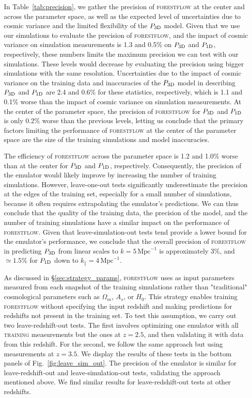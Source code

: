 \documentclass{aa}
\newcommand{\poned}{\ensuremath{P_{\rm 1D}}\xspace}
\newcommand{\pthreed}{\ensuremath{P_{\rm 3D}}\xspace}
\newcommand{\forestflow}{\textsc{forestflow}\xspace}
\newcommand{\lacehc}{\textsc{training}\xspace}
\newcommand{\iMpc}{\ensuremath{\,\mathrm{Mpc}^{-1}}}
\begin{document}
In Table~\ref{tab:precision}, we gather the precision of \forestflow at the center and across the parameter space, as well as the expected level of uncertainties due to cosmic variance and the limited flexibility of the \pthreed model. Given that we use our simulations to evaluate the precision of \forestflow, and the impact of cosmic variance on simulation measurements is 1.3 and 0.5\% on \pthreed and \poned, respectively, these numbers limits the maximum precision we can test with our simulations. These levels would decrease by evaluating the precision using bigger simulations with the same resolution. Uncertainties due to the impact of cosmic variance on the training data and inaccuracies of the \pthreed model in describing \pthreed and \poned are 2.4 and 0.6\% for these statistics, respectively, which is 1.1 and 0.1\% worse than the impact of cosmic variance on simulation measurements. At the center of the parameter space, the precision of \forestflow for \pthreed and \poned is only 0.2\% worse than the previous levels, letting us conclude that the primary factors limiting the performance of \forestflow at the center of the parameter space are the size of the training simulations and model inaccuracies. 

The efficiency of \forestflow across the parameter space is 1.2 and 1.0\% worse than at the center for \pthreed and \poned, respectively. Consequently, the precision of the emulator would likely improve by increasing the number of training simulations. However, leave-one-out tests significantly underestimate the precision at the edges of the training set, especially for a small number of simulations, because it often requires extrapolating the emulator's predictions. We can thus conclude that the quality of the training data, the precision of the model, and the number of training simulations have a similar impact on the performance of \forestflow. Given that leave-simulation-out tests tend provide a lower bound for the emulator's performance, we conclude that the overall precision of \forestflow in predicting \pthreed from linear scales to $k=5\iMpc$ is approximately 3\%, and $\simeq1.5\%$ for \poned down to $k_\parallel=4\iMpc$.

As discussed in \S\ref{sec:strategy_params}, \forestflow uses as input parameters measured from each snapshot of the training simulations rather than "traditional" cosmological parameters such as $\Omega_m$, $A_s$, or $H_0$. This strategy enables training \forestflow without specifying the input redshift and making predictions for redshifts not present in the training set. To test this assumption, we carry out two leave-redshift-out tests. The first involves optimizing one emulator with all \lacehc measurements but the ones at $z=2.5$, and then validating it with data from this redshift. For the second, we follow the same approach but using measurements at $z=3.5$. We display the results of these tests in the bottom panels of Fig.~\ref{fig:leave_sim_out}. The precision of the emulator is similar for leave-redshift-out and leave-simulation-out tests, validating the approach mentioned above. We find similar results for leave-redshift-out tests at other redshifts.
\end{document}
